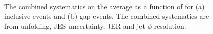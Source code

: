 \begin{figure}
\centering
\mbox{
              \quad
              \quad
                              }
\caption[]{
The combined systematics on the average \costwodphi{} as a function of \dy{}  for (a) inclusive events and (b) gap events.
The combined systematics are from unfolding, JES uncertainty, JER and jet $\phi$ resolution.
\label{GBJ2:SysComb:cos2}}
\end{figure}

